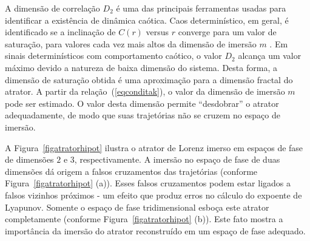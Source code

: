 A dimensão de correlação $D_{2}$ é uma das principais ferramentas usadas para identificar a existência de dinâmica caótica. Caos determinístico, em geral, é identificado se a inclinação de $C(r)$ versus $r$ converge para um valor de saturação, para valores cada vez mais altos da dimensão de imersão $m$ \cite{grassproca/83}. Em sinais determinísticos com comportamento caótico, o valor $D_{2}$ alcança um valor máximo devido a natureza de baixa dimensão do sistema. Desta forma, a dimensão de saturação obtida é uma aproximação para a dimensão fractal do atrator. A partir da relação~(\ref{eqconditak}), o valor da dimensão de imersão $m$ pode ser estimado. O valor desta dimensão permite ``desdobrar'' o atrator adequadamente, de modo que suas trajetórias não se cruzem no espaço de imersão. 

A Figura~\ref{figatratorhipot} ilustra o atrator de Lorenz imerso em espaços de fase de dimensões $2$ e $3$, respectivamente. A imersão no espaço de fase de duas dimensões dá origem a falsos cruzamentos das trajetórias (conforme Figura~\ref{figatratorhipot} (a)). Esses falsos cruzamentos podem estar ligados a falsos vizinhos próximos - um efeito que produz erros no cálculo do expoente de Lyapunov. Somente o espaço de fase tridimensional esboça este atrator completamente (conforme Figura~\ref{figatratorhipot} (b)). Este fato mostra a importância da imersão do atrator reconstruído em um espaço de fase adequado.


